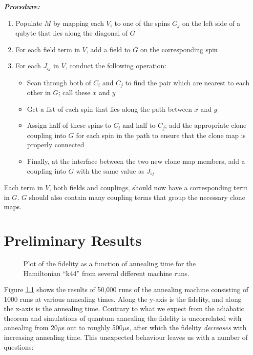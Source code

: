 \documentclass[12pt]{dalthesis}
\begin{document}
\emph{\textbf{Procedure:}}
\begin{enumerate}
	\item Populate $M$ by mapping each $V_i$ to one of the spins $G_j$ on the left side of a qubyte that lies along the diagonal of $G$
	\item For each field term in $V$, add a field to $G$ on the corresponding spin
	\item For each $J_{ij}$ in $V$, conduct the following operation:
		\begin{itemize}
			\item Scan through both of $C_i$ and $C_j$ to find the pair which are nearest to each other in $G$; call these $x$ and $y$
			\item Get a list of each spin that lies along the path between $x$ and $y$
			\item Assign half of these spins to $C_i$ and half to $C_j$; add the appropriate clone coupling into $G$ for each spin in the path to ensure that the clone map is properly connected
			\item Finally, at the interface between the two new clone map members, add a coupling into $G$ with the same value as $J_{ij}$
		\end{itemize}
\end{enumerate}

Each term in $V$, both fields and couplings, should now have a corresponding term in $G$.  $G$ should also contain many coupling terms that group the necessary clone maps.

\chapter{Preliminary Results}

\begin{figure}
	\caption[Fidelity vs Time]{Plot of the fidelity as a function of annealing time for the Hamiltonian ``k44'' from several different machine runs.}
	\label{fid_v_time}
\end{figure}

Figure \ref{fid_v_time} shows the results of 50,000 runs of the annealing machine consisting of 1000 runs at various annealing times.  Along the y-axis is the fidelity, and along the x-axis is the annealing time.  Contrary to what we expect from the adiabatic theorem and simulations of quantum annealing the fidelity is uncorrelated with annealing from 20$\mu$s out to roughly 500$ \mu$s, after which the fidelity \emph{decreases} with increasing annealing time.  This unexpected behaviour leaves us with a number of questions:
\end{document}
